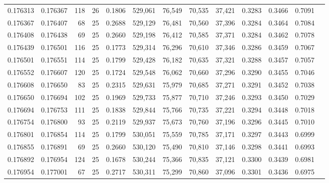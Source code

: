 \begin{tabular}{rrrrrrrrrrrrr}
0.176313 & 0.176367 &   118 &  26 &                                     0.1806 & 529,061 &  76,549 &  70,535 &  37,421 & 0.3283 & 0.3466 & 0.7091 \\
0.176367 & 0.176407 &    68 &  25 &                                     0.2688 & 529,129 &  76,481 &  70,560 &  37,396 & 0.3284 & 0.3464 & 0.7084 \\
0.176408 & 0.176438 &    69 &  25 &                                     0.2660 & 529,198 &  76,412 &  70,585 &  37,371 & 0.3284 & 0.3462 & 0.7078 \\
0.176439 & 0.176501 &   116 &  25 &                                     0.1773 & 529,314 &  76,296 &  70,610 &  37,346 & 0.3286 & 0.3459 & 0.7067 \\
0.176501 & 0.176551 &   114 &  25 &                                     0.1799 & 529,428 &  76,182 &  70,635 &  37,321 & 0.3288 & 0.3457 & 0.7057 \\
0.176552 & 0.176607 &   120 &  25 &                                     0.1724 & 529,548 &  76,062 &  70,660 &  37,296 & 0.3290 & 0.3455 & 0.7046 \\
0.176608 & 0.176650 &    83 &  25 &                                     0.2315 & 529,631 &  75,979 &  70,685 &  37,271 & 0.3291 & 0.3452 & 0.7038 \\
0.176650 & 0.176694 &   102 &  25 &                                     0.1969 & 529,733 &  75,877 &  70,710 &  37,246 & 0.3293 & 0.3450 & 0.7029 \\
0.176694 & 0.176753 &   111 &  25 &                                     0.1838 & 529,844 &  75,766 &  70,735 &  37,221 & 0.3294 & 0.3448 & 0.7018 \\
0.176754 & 0.176800 &    93 &  25 &                                     0.2119 & 529,937 &  75,673 &  70,760 &  37,196 & 0.3296 & 0.3445 & 0.7010 \\
0.176801 & 0.176854 &   114 &  25 &                                     0.1799 & 530,051 &  75,559 &  70,785 &  37,171 & 0.3297 & 0.3443 & 0.6999 \\
0.176855 & 0.176891 &    69 &  25 &                                     0.2660 & 530,120 &  75,490 &  70,810 &  37,146 & 0.3298 & 0.3441 & 0.6993 \\
0.176892 & 0.176954 &   124 &  25 &                                     0.1678 & 530,244 &  75,366 &  70,835 &  37,121 & 0.3300 & 0.3439 & 0.6981 \\
0.176954 & 0.177001 &    67 &  25 &                                     0.2717 & 530,311 &  75,299 &  70,860 &  37,096 & 0.3301 & 0.3436 & 0.6975 \\

\end{tabular}
